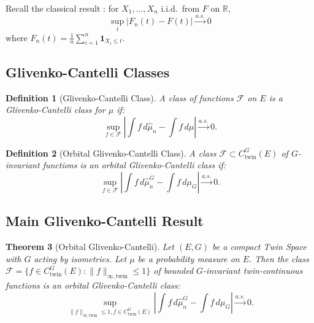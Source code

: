 \documentclass[11pt]{article}
\newtheorem{theorem}{Theorem}[section]
\newtheorem{definition}[theorem]{Definition}
\newcommand{\R}{\mathbb{R}}
\begin{document}
Recall the classical result \citep{Glivenko1933,Cantelli1933}: for $X_1, \ldots, X_n$ i.i.d.\ from $F$ on $\R$,
\begin{equation}\label{eq:classical_gc}
\sup_t |F_n(t) - F(t)| \xrightarrow{a.s.} 0
\end{equation}
where $F_n(t) = \frac{1}{n} \sum_{i=1}^n \mathbf{1}_{X_i \leq t}$.

\subsection{Glivenko-Cantelli Classes}

\begin{definition}[Glivenko-Cantelli Class]\label{def:gc_class}
A class of functions $\mathcal{F}$ on $E$ is a Glivenko-Cantelli class for $\mu$ if:
\begin{equation}\label{eq:gc_class}
\sup_{f \in \mathcal{F}} \left| \int f \, d\hat{\mu}_n - \int f \, d\mu \right| \xrightarrow{a.s.} 0.
\end{equation}
\end{definition}

\begin{definition}[Orbital Glivenko-Cantelli Class]\label{def:orbital_gc_class}
A class $\mathcal{F} \subset C_{\mathrm{twin}}^G(E)$ of $G$-invariant functions is an orbital Glivenko-Cantelli class if:
\begin{equation}\label{eq:orbital_gc_class}
\sup_{f \in \mathcal{F}} \left| \int f \, d\hat{\mu}_n^G - \int f \, d\mu_G \right| \xrightarrow{a.s.} 0.
\end{equation}
\end{definition}

\subsection{Main Glivenko-Cantelli Result}

\begin{theorem}[Orbital Glivenko-Cantelli]\label{thm:orbital_gc}
Let $(E, G)$ be a compact Twin Space with $G$ acting by isometries. Let $\mu$ be a probability measure on $E$. Then the class $\mathcal{F} = \{f \in C_{\mathrm{twin}}^G(E) : \|f\|_{\infty,\mathrm{twin}} \leq 1\}$ of bounded $G$-invariant twin-continuous functions is an orbital Glivenko-Cantelli class:
\begin{equation}\label{eq:orbital_gc}
\sup_{\|f\|_{\infty,\mathrm{twin}} \leq 1, f \in C_{\mathrm{twin}}^G(E)} \left| \int f \, d\hat{\mu}_n^G - \int f \, d\mu_G \right| \xrightarrow{a.s.} 0.
\end{equation}
\end{theorem}
\end{document}
